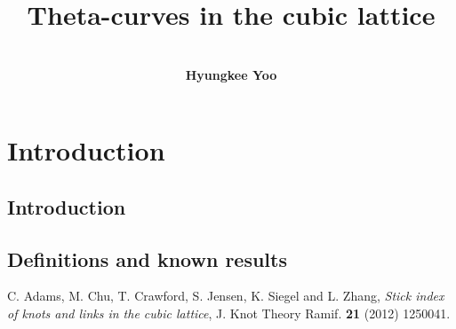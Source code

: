 \documentclass[12pt]{report}
\numberwithin{figure}{chapter}
\theoremstyle{plain}
\theoremstyle{definition}
\theoremstyle{corollary}
\theoremstyle{definition}
\theoremstyle{plain}
\theoremstyle{definition}
\theoremstyle{plain}
\begin{document}
\title{\textbf{Theta-curves in the cubic lattice}}
\author{\\\textbf{Hyungkee Yoo}\\}
\setcounter{tocdepth}{1}

\date{}
 \maketitle{}


\tableofcontents

\newpage
\begin{abstract}

\end{abstract}




\newpage

\setcounter{page}{1} \setcounter{section}{0}
\chapter{Introduction} \label{chap:intro}


\section{Introduction} \label{sec:intro}


\section{Definitions and known results} \label{sec:def}


\newpage



\newpage

\begin{thebibliography}{AA}
 C. Adams, M. Chu, T. Crawford, S. Jensen, K. Siegel and L. Zhang,
    {\em Stick index of knots and links in the cubic lattice},
    J. Knot Theory Ramif. \textbf{21} (2012) 1250041.



\end{thebibliography}



%
%
%
%
%
\end{document}
